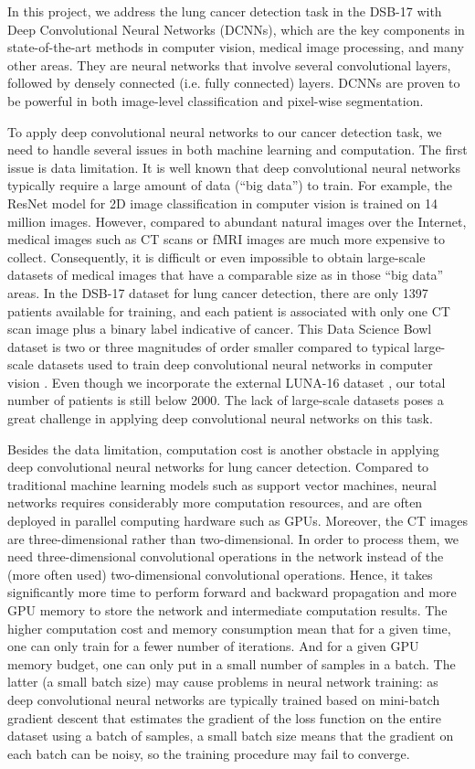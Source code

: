 \documentclass{article}
\begin{document}
In this project, we address the lung cancer detection task in the DSB-17 with Deep Convolutional Neural Networks (DCNNs), which are the key components in state-of-the-art methods in computer vision, medical image processing, and many other areas. They are neural networks that involve several convolutional layers, followed by densely connected (i.e. fully connected) layers. DCNNs are proven to be powerful in both image-level classification and pixel-wise segmentation.

To apply deep convolutional neural networks to our cancer detection task, we need to handle several issues in both machine learning and computation. The first issue is data limitation. It is well known that deep convolutional neural networks typically require a large amount of data (``big data'') to train. For example, the ResNet model \cite{he2016deep} for 2D image classification in computer vision is trained on 14 million images. However, compared to abundant natural images over the Internet, medical images such as CT scans or fMRI images are much more expensive to collect. Consequently, it is difficult or even impossible to obtain large-scale datasets of medical images that have a comparable size as in those ``big data'' areas. In the DSB-17 dataset for lung cancer detection, there are only 1397 patients available for training, and each patient is associated with only one CT scan image plus a binary label indicative of cancer. This Data Science Bowl dataset is two or three magnitudes of order smaller compared to typical large-scale datasets used to train deep convolutional neural networks in computer vision \cite{deng2009imagenet,lin2014microsoft}. Even though we incorporate the external LUNA-16 dataset \cite{setio2016validation}, our total number of patients is still below 2000. The lack of large-scale datasets poses a great challenge in applying deep convolutional neural networks on this task.

Besides the data limitation, computation cost is another obstacle in applying deep convolutional neural networks for lung cancer detection. Compared to traditional machine learning models such as support vector machines, neural networks requires considerably more computation resources, and are often deployed in parallel computing hardware such as GPUs. Moreover, the CT images are three-dimensional rather than two-dimensional. In order to process them, we need three-dimensional convolutional operations in the network instead of the (more often used) two-dimensional convolutional operations. Hence, it takes significantly more time to perform forward and backward propagation and more GPU memory to store the network and intermediate computation results. The higher computation cost and memory consumption mean that for a given time, one can only train for a fewer number of iterations. And for a given GPU memory budget, one can only put in a small number of samples in a batch. The latter (a small batch size) may cause problems in neural network training: as deep convolutional neural networks are typically trained based on mini-batch gradient descent that estimates the gradient of the loss function on the entire dataset using a batch of samples, a small batch size means that the gradient on each batch can be noisy, so the training procedure may fail to converge.
\end{document}
